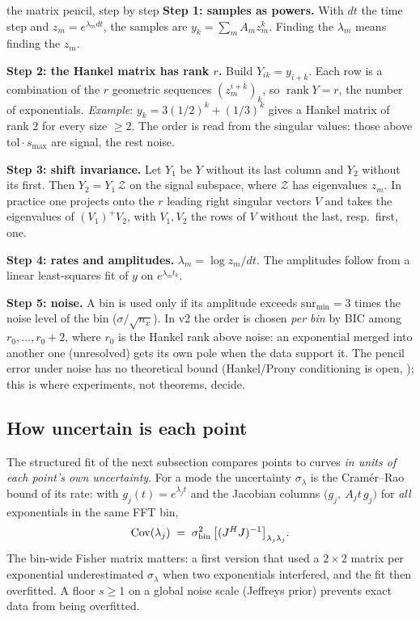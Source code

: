 \begin{explained}{the matrix pencil, step by step}
\textbf{Step 1: samples as powers.} With $dt$ the time step and $z_m=e^{\lambda_mdt}$, the samples are $y_k=\sum_mA_mz_m^k$. Finding the $\lambda_m$ means finding the $z_m$.

\medskip\textbf{Step 2: the Hankel matrix has rank $r$.} Build $Y_{ik}=y_{i+k}$. Each row is a combination of the $r$ geometric sequences $(z_m^{i+k})_k$, so $\operatorname{rank}Y=r$, the number of exponentials. \emph{Example}: $y_k=3(1/2)^k+(1/3)^k$ gives a Hankel matrix of rank $2$ for every size $\ge2$. The order is read from the singular values: those above $\text{tol}\cdot s_{\max}$ are signal, the rest noise.

\medskip\textbf{Step 3: shift invariance.} Let $Y_1$ be $Y$ without its last column and $Y_2$ without its first. Then $Y_2=Y_1\,\mathcal Z$ on the signal subspace, where $\mathcal Z$ has eigenvalues $z_m$. In practice one projects onto the $r$ leading right singular vectors $V$ and takes the eigenvalues of $(V_1)^{+}V_2$, with $V_1,V_2$ the rows of $V$ without the last, resp.\ first, one.

\medskip\textbf{Step 4: rates and amplitudes.} $\lambda_m=\log z_m/dt$. The amplitudes follow from a linear least-squares fit of $y$ on $e^{\lambda_mt_k}$.

\medskip\textbf{Step 5: noise.} A bin is used only if its amplitude exceeds $\mathrm{snr}_{\min}=3$ times the noise level of the bin ($\sigma/\sqrt{n_x}$). In v2 the order is chosen \emph{per bin} by BIC among $r_0,\dots,r_0+2$, where $r_0$ is the Hankel rank above noise: an exponential merged into another one (unresolved) gets its own pole when the data support it. The pencil error under noise has no theoretical bound (Hankel/Prony conditioning is open, ); this is where experiments, not theorems, decide.
\end{explained}

\subsection{How uncertain is each point}
The structured fit of the next subsection compares points to curves \emph{in units of each point's own uncertainty}. For a mode the uncertainty $\sigma_\lambda$ is the Cram\'er--Rao bound of its rate: with $g_j(t)=e^{\lambda_jt}$ and the Jacobian columns $\big(g_j,\ A_jt\,g_j\big)$ for \emph{all} exponentials in the same FFT bin,
\begin{equation}\label{eq:crb}
\operatorname{Cov}(\lambda_j)\;=\;\sigma_{\mathrm{bin}}^2\,\big[(J^{H}J)^{-1}\big]_{\lambda_j\lambda_j}.
\end{equation}
The bin-wide Fisher matrix matters: a first version that used a $2\times2$ matrix per exponential underestimated $\sigma_\lambda$ when two exponentials interfered, and the fit then overfitted. A floor $s\ge1$ on a global noise scale (Jeffreys prior) prevents exact data from being overfitted.

